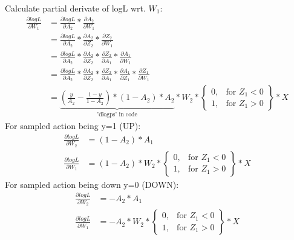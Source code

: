 \documentclass{article} %
\begin{document}
    Calculate partial derivate of logL wrt. $W_{1}$:
    \begin{align*}
        \frac{\partial logL}{\partial W_{1}} &= \frac{\partial logL}{\partial A_{2}} * \frac{\partial A_{2}}{\partial W_{1}} \\
        &= \frac{\partial logL}{\partial A_{2}} * \frac{\partial A_{2}}{\partial Z_{2}}  * \frac{\partial Z_{2}}{\partial W_{1}} \\
        &= \frac{\partial logL}{\partial A_{2}} * \frac{\partial A_{2}}{\partial Z_{2}}  * \frac{\partial Z_{2}}{\partial A_{1}}
        * \frac{\partial A_{1}}{\partial W_{1}} \\
        &= \frac{\partial logL}{\partial A_{2}} * \frac{\partial A_{2}}{\partial Z_{2}}  * \frac{\partial Z_{2}}{\partial A_{1}}
        * \frac{\partial A_{1}}{\partial Z_{1}} * \frac{\partial Z_{1}}{\partial W_{1}} \\
        &= \underbrace{(\frac{y}{A_{2}} - \frac{1 - y}{1 - A_{2}}) * (1 - A_{2}) * A_{2}}_\text{'dlogps' in code}  * W_{2}
        * \left\{\begin{array}{lr}
            0, & \text{for } Z_{1} < 0 \\
            1, & \text{for } Z_{1} > 0
        \end{array}\right\} * X
    \end{align*}
    For sampled action being y=1 (UP):
    \begin{align*}
        \frac{\partial logL}{\partial W_{2}} &= (1 - A_{2}) * A_{1} \\
        \frac{\partial logL}{\partial W_{1}} &= (1 - A_{2}) * W_{2}* \left\{\begin{array}{lr}
            0, & \text{for } Z_{1} < 0 \\
            1, & \text{for } Z_{1} > 0
        \end{array}\right\} * X
    \end{align*}
    For sampled action being down y=0 (DOWN):
    \begin{align*}
        \frac{\partial logL}{\partial W_{2}} &= - A_{2} * A_{1} \\
        \frac{\partial logL}{\partial W_{1}} &= - A_{2} * W_{2} * \left\{\begin{array}{lr}
            0, & \text{for } Z_{1} < 0 \\
            1, & \text{for } Z_{1} > 0
        \end{array}\right\} * X
    \end{align*}

    
\end{document}
